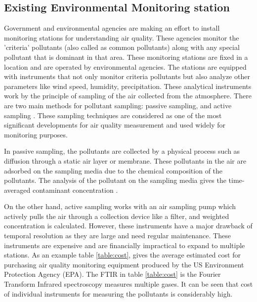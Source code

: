  
 \subsection{Existing Environmental Monitoring station}
 
 Government and environmental agencies are making an effort to install monitoring stations for understanding air quality. These agencies monitor the 'criteria' pollutants (also called as common pollutants) along with any special pollutant that is dominant in that area. These monitoring stations are fixed in a location and are operated by environmental agencies. The stations are equipped with instruments that not only monitor criteria pollutants but also analyze other parameters like wind speed, humidity, precipitation. These analytical instruments work by the principle of sampling of the air collected from the atmosphere.
 There are two main methods for pollutant sampling: passive sampling, and active sampling \cite{Balakrishnan2015}. These sampling techniques are considered as one of the most significant developments for air quality measurement and used widely for monitoring purposes. 
 
 \par
 
 In passive sampling, the pollutants are collected by a physical process such as diffusion through a static air layer or membrane. These pollutants in the air are adsorbed on the sampling media due to the chemical composition of the pollutants. The analysis of the pollutant on the sampling media gives the time-averaged contaminant concentration \cite{Environment2009}. 
 
 On the other hand, active sampling works with an air sampling pump which actively pulls the air through a collection device like a filter, and weighted concentration is calculated. However, these instruments have a major drawback of temporal resolution as they are large and need regular maintenance. These instruments are expensive and are financially impractical to expand to multiple stations. As an example table \ref{table:cost}, gives the average estimated cost for purchasing air quality monitoring equipment produced by the US Environment Protection Agency (EPA). The FTIR in table \ref{table:cost} is the Fourier Transform Infrared spectroscopy measures multiple gases. It can be seen that cost of individual instruments for measuring the pollutants is considerably high. 
 
